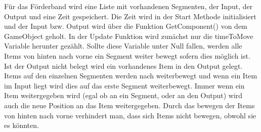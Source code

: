\documentclass[12pt, titlepage]{article}
\begin{document}
Für das Förderband wird eine Liste mit vorhandenen Segmenten, der Input, der Output und eine Zeit gespeichert. Die Zeit wird in der Start Methode initialisiert und der Input bzw. Output wird über die Funktion \glqq GetComponent()\grqq{} von dem GameObject geholt. In der Update Funktion wird zunächst nur die timeToMove Variable herunter gezählt. Sollte diese Variable unter Null fallen, werden alle Items von hinten nach vorne ein Segment weiter bewegt sofern dies möglich ist. Ist der Output nicht belegt wird ein vorhandenes Item in den Output gelegt. Items auf den einzelnen Segmenten werden nach weiterbewegt und wenn ein Item im Input liegt wird dies auf das erste Segment weiterbewegt. Immer wenn ein Item weitergegeben wird (egal ob an ein Segment, oder an den Output) wird auch die neue Position an das Item weitergegeben. Durch das bewegen der Items von hinten nach vorne verhindert man, dass sich Items nicht bewegen, obwohl sie es könnten.
\end{document}
